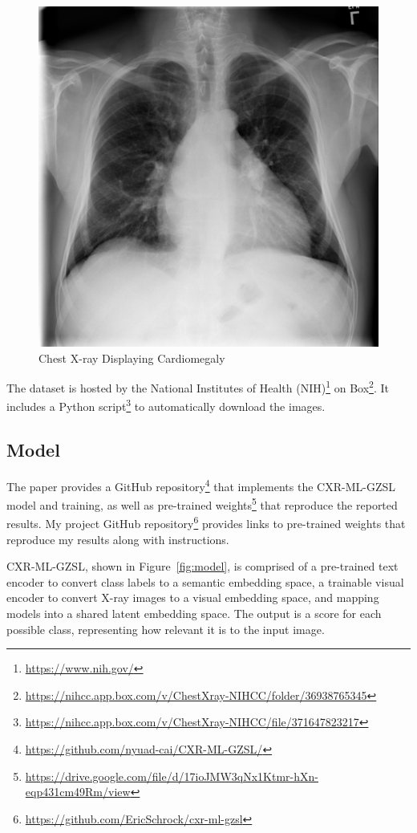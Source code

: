 \documentclass[letterpaper]{article} %
\begin{document}
\begin{figure}[h!]
\centering
\includegraphics[width=0.9\columnwidth]{cxr.png}
\caption{Chest X-ray Displaying Cardiomegaly}
\label{fig:cxr}
\end{figure}

The dataset is hosted by the National Institutes of Health (NIH)\footnote{\url{https://www.nih.gov/}} on Box\footnote{\url{https://nihcc.app.box.com/v/ChestXray-NIHCC/folder/36938765345}}. It includes a Python script\footnote{\url{https://nihcc.app.box.com/v/ChestXray-NIHCC/file/371647823217}} to automatically download the images.

\subsection{Model}
\label{sec:model}

The paper provides a GitHub repository\footnote{\url{https://github.com/nyuad-cai/CXR-ML-GZSL/}} that implements the CXR-ML-GZSL model and training, as well as pre-trained weights\footnote{\url{https://drive.google.com/file/d/17ioJMW3qNx1Ktmr-hXn-eqp431cm49Rm/view}} that reproduce the reported results. My project GitHub repository\footnote{\url{https://github.com/EricSchrock/cxr-ml-gzsl}} provides links to pre-trained weights that reproduce my results along with instructions.

CXR-ML-GZSL, shown in Figure~\ref{fig:model}, is comprised of a pre-trained text encoder to convert class labels to a semantic embedding space, a trainable visual encoder to convert X-ray images to a visual embedding space, and mapping models into a shared latent embedding space. The output is a score for each possible class, representing how relevant it is to the input image.
\end{document}
